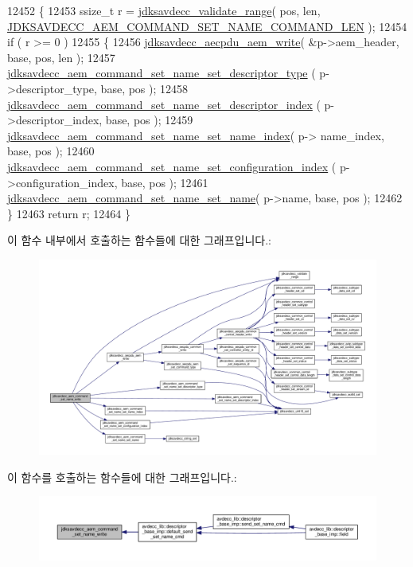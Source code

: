 \begin{DoxyCode}
12452 \{
12453     ssize\_t r = \hyperlink{group__util_ga9c02bdfe76c69163647c3196db7a73a1}{jdksavdecc\_validate\_range}( pos, len, 
      \hyperlink{group__command__set__name_ga133a28cbd2bc0e77c69d8135f36324f6}{JDKSAVDECC\_AEM\_COMMAND\_SET\_NAME\_COMMAND\_LEN} );
12454     \textcolor{keywordflow}{if} ( r >= 0 )
12455     \{
12456         \hyperlink{group__aecpdu__aem_gad658e55771cce77cecf7aae91e1dcbc5}{jdksavdecc\_aecpdu\_aem\_write}( &p->aem\_header, base, pos, len );
12457         \hyperlink{group__command__set__name_ga558417c3de2544b4d6588ba38bec27c7}{jdksavdecc\_aem\_command\_set\_name\_set\_descriptor\_type}
      ( p->descriptor\_type, base, pos );
12458         \hyperlink{group__command__set__name_gae69dab05aea66a2e94c696b71f16057e}{jdksavdecc\_aem\_command\_set\_name\_set\_descriptor\_index}
      ( p->descriptor\_index, base, pos );
12459         \hyperlink{group__command__set__name_gab5febf3333365832904e47914efe1549}{jdksavdecc\_aem\_command\_set\_name\_set\_name\_index}( p->
      name\_index, base, pos );
12460         \hyperlink{group__command__set__name_gab5e43bf973b2f00bd6d5f7cf6b0736dd}{jdksavdecc\_aem\_command\_set\_name\_set\_configuration\_index}
      ( p->configuration\_index, base, pos );
12461         \hyperlink{group__command__set__name_ga49b59c695339c3f6e2fcc1f83d6e410f}{jdksavdecc\_aem\_command\_set\_name\_set\_name}( p->name, base, 
      pos );
12462     \}
12463     \textcolor{keywordflow}{return} r;
12464 \}
\end{DoxyCode}


이 함수 내부에서 호출하는 함수들에 대한 그래프입니다.\+:
\nopagebreak
\begin{figure}[H]
\begin{center}
\leavevmode
\includegraphics[width=350pt]{group__command__set__name_ga42e5da3685796fb973c5824f960eed2e_cgraph}
\end{center}
\end{figure}




이 함수를 호출하는 함수들에 대한 그래프입니다.\+:
\nopagebreak
\begin{figure}[H]
\begin{center}
\leavevmode
\includegraphics[width=350pt]{group__command__set__name_ga42e5da3685796fb973c5824f960eed2e_icgraph}
\end{center}
\end{figure}


